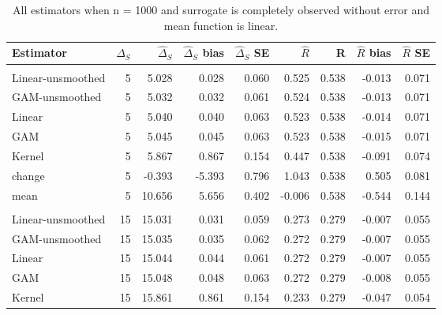 \documentclass[useAMS,usenatbib,referee]{biom}
\begin{document}
\begin{table}[t]

\caption{\label{tab:oracle-large-n-lin}All estimators when n = 1000 and surrogate is completely observed without error and mean function is linear.}
\centering
\begin{tabular}{lrrrrrrrr}
\toprule
Estimator & $\Delta_S$ & $\widehat{\Delta}_S$ & $\widehat{\Delta}_S$ bias & $\widehat{\Delta}_S$ SE & $\widehat{R}$ & R & $\widehat{R}$ bias & $\widehat{R}$ SE\\
\midrule
\addlinespace[0.3em]
\multicolumn{9}{l}{\textbf{Small residual effect}}\\
\hspace{1em}Linear-unsmoothed & 5 & 5.028 & 0.028 & 0.060 & 0.525 & 0.538 & -0.013 & 0.071\\
\hspace{1em}GAM-unsmoothed & 5 & 5.032 & 0.032 & 0.061 & 0.524 & 0.538 & -0.013 & 0.071\\
\hspace{1em}Linear & 5 & 5.040 & 0.040 & 0.063 & 0.523 & 0.538 & -0.014 & 0.071\\
\hspace{1em}GAM & 5 & 5.045 & 0.045 & 0.063 & 0.523 & 0.538 & -0.015 & 0.071\\
\hspace{1em}Kernel & 5 & 5.867 & 0.867 & 0.154 & 0.447 & 0.538 & -0.091 & 0.074\\
\hspace{1em}change & 5 & -0.393 & -5.393 & 0.796 & 1.043 & 0.538 & 0.505 & 0.081\\
\hspace{1em}mean & 5 & 10.656 & 5.656 & 0.402 & -0.006 & 0.538 & -0.544 & 0.144\\
\addlinespace[0.3em]
\multicolumn{9}{l}{\textbf{Medium residual effect}}\\
\hspace{1em}Linear-unsmoothed & 15 & 15.031 & 0.031 & 0.059 & 0.273 & 0.279 & -0.007 & 0.055\\
\hspace{1em}GAM-unsmoothed & 15 & 15.035 & 0.035 & 0.062 & 0.272 & 0.279 & -0.007 & 0.055\\
\hspace{1em}Linear & 15 & 15.044 & 0.044 & 0.061 & 0.272 & 0.279 & -0.007 & 0.055\\
\hspace{1em}GAM & 15 & 15.048 & 0.048 & 0.063 & 0.272 & 0.279 & -0.008 & 0.055\\
\hspace{1em}Kernel & 15 & 15.861 & 0.861 & 0.154 & 0.233 & 0.279 & -0.047 & 0.054\\

\end{tabular}
\end{table}
\end{document}
